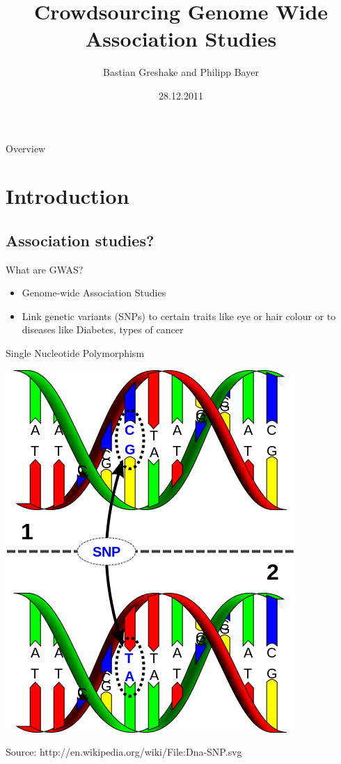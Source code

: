 \documentclass[12pt,a4paper]{beamer}
\title[Open-GWAS]{Crowdsourcing Genome Wide Association Studies}%
\date{28.12.2011}
\author{Bastian Greshake and Philipp Bayer}
\begin{document}
\begin{frame}
\titlepage
\end{frame}

\begin{frame}{Overview}
\tableofcontents
\end{frame}

\section{Introduction}
\subsection{Association studies?}

\begin{frame}{What are GWAS?}
\begin{itemize}
\item Genome-wide Association Studies
\pause \item Link genetic variants (SNPs) to certain traits like eye or hair colour or to diseases like Diabetes, types of cancer
\end{itemize}
\end{frame}

\begin{frame}{Single Nucleotide Polymorphism}
\begin{center}
\includegraphics[scale=0.4]{SNP.png} \\
\begin{tiny}Source: http://en.wikipedia.org/wiki/File:Dna-SNP.svg\end{tiny}
\end{center}
\end{frame}
\end{document}
